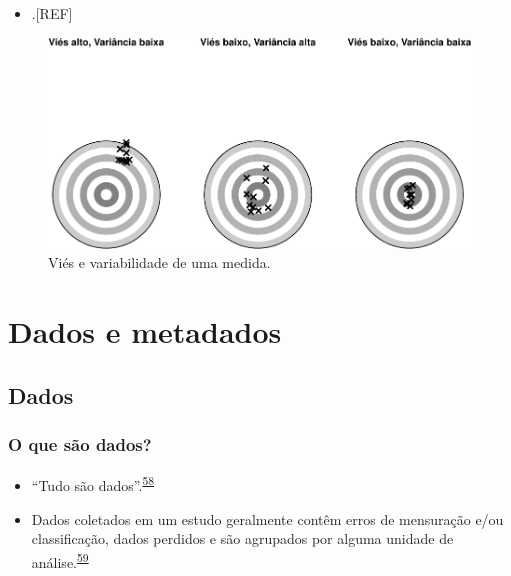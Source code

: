 \documentclass[
  a4paper,
]{book}
\providecommand{\tightlist}{%
  \setlength{\itemsep}{0pt}\setlength{\parskip}{0pt}}
\begin{document}
\begin{itemize}
\tightlist
\item
  .{[}REF{]}
\end{itemize}

\begin{figure}

{\centering \includegraphics{Ciencia-com-R_files/figure-latex/vies-variabilidade-1} 

}

\caption{Viés e variabilidade de uma medida.}\label{fig:vies-variabilidade}
\end{figure}

\hypertarget{dados-metadados}{%
\chapter{\texorpdfstring{\textbf{Dados e metadados}}{Dados e metadados}}\label{dados-metadados}}

\hypertarget{dados}{%
\section{Dados}\label{dados}}

\hypertarget{o-que-suxe3o-dados}{%
\subsection{O que são dados?}\label{o-que-suxe3o-dados}}

\begin{itemize}
\item
  ``Tudo são dados''.\textsuperscript{\protect\hyperlink{ref-Olson2021}{58}}
\item
  Dados coletados em um estudo geralmente contêm erros de mensuração e/ou classificação, dados perdidos e são agrupados por alguma unidade de análise.\textsuperscript{\protect\hyperlink{ref-van2022a}{59}}
\end{itemize}
\end{document}
